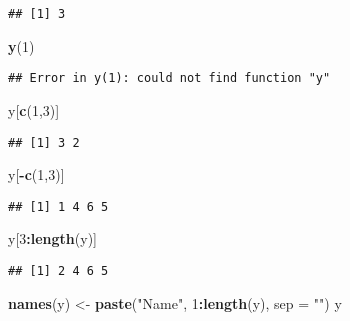 \documentclass[]{article}
\newenvironment{Shaded}{\begin{snugshade}}{\end{snugshade}}
\newcommand{\KeywordTok}[1]{\textcolor[rgb]{0.13,0.29,0.53}{\textbf{#1}}}
\newcommand{\DataTypeTok}[1]{\textcolor[rgb]{0.13,0.29,0.53}{#1}}
\newcommand{\DecValTok}[1]{\textcolor[rgb]{0.00,0.00,0.81}{#1}}
\newcommand{\StringTok}[1]{\textcolor[rgb]{0.31,0.60,0.02}{#1}}
\newcommand{\OperatorTok}[1]{\textcolor[rgb]{0.81,0.36,0.00}{\textbf{#1}}}
\newcommand{\NormalTok}[1]{#1}
\begin{document}
\begin{verbatim}
## [1] 3
\end{verbatim}

\begin{Shaded}
\begin{Highlighting}[]
\KeywordTok{y}\NormalTok{(}\DecValTok{1}\NormalTok{)}
\end{Highlighting}
\end{Shaded}

\begin{verbatim}
## Error in y(1): could not find function "y"
\end{verbatim}

\begin{Shaded}
\begin{Highlighting}[]
\NormalTok{y[}\KeywordTok{c}\NormalTok{(}\DecValTok{1}\NormalTok{,}\DecValTok{3}\NormalTok{)]}
\end{Highlighting}
\end{Shaded}

\begin{verbatim}
## [1] 3 2
\end{verbatim}

\begin{Shaded}
\begin{Highlighting}[]
\NormalTok{y[}\OperatorTok{-}\KeywordTok{c}\NormalTok{(}\DecValTok{1}\NormalTok{,}\DecValTok{3}\NormalTok{)]}
\end{Highlighting}
\end{Shaded}

\begin{verbatim}
## [1] 1 4 6 5
\end{verbatim}

\begin{Shaded}
\begin{Highlighting}[]
\NormalTok{y[}\DecValTok{3}\OperatorTok{:}\KeywordTok{length}\NormalTok{(y)]}
\end{Highlighting}
\end{Shaded}

\begin{verbatim}
## [1] 2 4 6 5
\end{verbatim}

\begin{Shaded}
\begin{Highlighting}[]
\KeywordTok{names}\NormalTok{(y) <-}\StringTok{ }\KeywordTok{paste}\NormalTok{(}\StringTok{"Name"}\NormalTok{, }\DecValTok{1}\OperatorTok{:}\KeywordTok{length}\NormalTok{(y), }\DataTypeTok{sep =} \StringTok{""}\NormalTok{)}
\NormalTok{y}
\end{Highlighting}
\end{Shaded}
\end{document}
